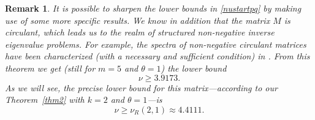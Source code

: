 \documentclass[a4paper]{article}
\newtheorem{remark}{Remark}
\newcommand{\te}{\theta}
\newcommand{\nplus}{\mathbb{N}^+}
\begin{document}
\begin{remark}

It is possible to sharpen the lower bounds in \eqref{nustartpq} by making use of some more specific results. 
We know in addition that the matrix $M$ is \emph{circulant}, which leads us to the realm of 
\emph{structured non-negative inverse eigenvalue problems}. For example, 
the spectra of non-negative circulant matrices have been characterized (with a necessary \emph{and} sufficient condition) in \cite[Theorem 10]{rojosoto}. From this theorem we get (still for $m=5$ and $\te=1$) the lower bound
\[
\nu\ge 3.9173.
\]
As we will see, the precise lower bound for this matrix---according to our Theorem~\ref{thm2} with $k=2$ and $\te=1$---is
\[
\nu\ge \nu_R(2,1)\approx 4.4111.
\]
\end{remark}
\end{document}
